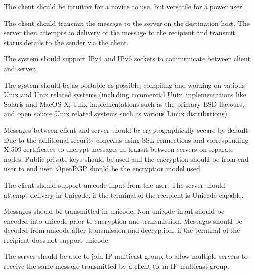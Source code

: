 
The client should be intuitive for a novice to use, but versatile for a
power user.


The client should transmit the message to the server on the destination
host. The server then attempts to delivery of the message to the
recipient and transmit status details to the sender via the client.


The system should support IPv4 and IPv6 sockets to communicate between
client and server. 


The system should be as portable as possible, compiling and working on 
various Unix and Unix related systems (including commercial Unix
implementations like Solaris and MacOS X, Unix 
implementations such as the primary BSD flavours, and open source Unix
related systems such as various Linux distributions) 


Messages between client and server should be cryptographically secure by
default. Due to the additional security concerns using SSL connections
and corresponding X.509 certificates to encrypt messages in transit
between servers on separate nodes. Public-private keys should
be used and the encryption should be from end user to end user.
OpenPGP should be the encryption model used.


The client should support unicode input from the user. The server should 
attempt delivery in Unicode, if the terminal of the recipient is Unicode 
capable. 


Messages should be transmitted in unicode. Non unicode input should be
encoded into unicode prior to encryption and transmission. Messages
should be decoded from unicode after transmission and decryption, if
the terminal of the recipient does not support unicode. 


The server should be able to join IP multicast group, to allow multiple
servers to receive the same message transmitted by a client to an IP
multicast group. 
